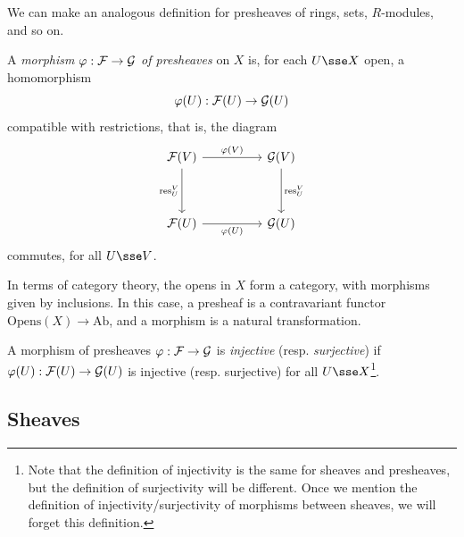 \documentclass{article}
\begin{document}
We can make an analogous definition for presheaves of rings, sets, \(R\)-modules, and so on.

\begin{definition}
     A \emph{morphism \(\varphi : \mathcal{F} \to \mathcal{G}\) of presheaves} on \(X\) is, for each \(U \sse X\) open, a homomorphism
    \[\varphi(U) : \mathcal{F}(U) \to \mathcal{G}(U)\]
    compatible with restrictions, that is, the diagram
\[\begin{tikzcd}
	{\mcF(V)} && {\mcG(V)} \\
	\\
	{\mcF(U)} && {\mcG(U)}
	\arrow["{\res^V_U}"', from=1-1, to=3-1]
	\arrow["{\res^V_U}", from=1-3, to=3-3]
	\arrow["{\varphi(V)}", from=1-1, to=1-3]
	\arrow["{\varphi(U)}"', from=3-1, to=3-3]
\end{tikzcd}\]
commutes, for all \(U \sse V\).
\end{definition}

In terms of category theory, the opens in \(X\) form a category, with morphisms given by inclusions. In this case, a presheaf is a contravariant functor \(\text{Opens}(X) \to \text{Ab}\), and a morphism is a natural transformation.

A morphism of presheaves \(\varphi : \mathcal{F} \to \mathcal{G}\) is \emph{injective} (resp. \emph{surjective}) if \(\varphi(U) : \mathcal{F}(U) \to \mathcal{G}(U)\) is injective (resp. surjective) for all \(U \sse X\)\footnote{Note that the definition of injectivity is the same for sheaves and presheaves, but the definition of surjectivity will be different. Once we mention the definition of injectivity/surjectivity of morphisms between sheaves, we will forget this definition.}.

\lec

\subsection{Sheaves}
\end{document}
